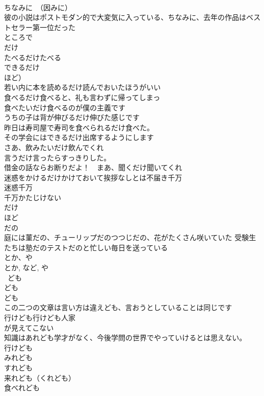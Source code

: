 \documentclass[8pt]{extreport}
\begin{document}
\begin{CJK}{UTF8}{min}
\\	ちなみに　（因みに）	
\\	彼の小説はポストモダン的で大変気に入っている、ちなみに、去年の作品はベストセラー第一位だった	
\\	ところで 
\\	だけ　
\\	たべるだけたべる 
\\	できるだけ	
\\	ほど） 
\\	若い内に本を読めるだけ読んでおいたほうがいい 
\\	食べるだけ食べると、礼も言わずに帰ってしまっ 
\\	食べたいだけ食べるのが僕の主義です 
\\	うちの子は背が伸びるだけ伸びた感じです 
\\	昨日は寿司屋で寿司を食べられるだけ食べた。 
\\	その学会にはできるだけ出席するようにします 
\\	さあ、飲みたいだけ飲んでくれ　 
\\	言うだけ言ったらすっきりした。 
\\	借金の話ならお断りだよ！　まあ、聞くだけ聞いてくれ 
\\	迷惑をかけるだけかけておいて挨拶なしとは不届き千万
\\	迷惑千万 
\\	千万かたじけない 
\\	だけ
\\	ほど
\\	だの 
\\	庭には菫だの、チューリップだのつつじだの、花がたくさん咲いていた 受験生たちは塾だのテストだのと忙しい毎日を送っている 
\\	とか、や 
\\	とか, など, や
\\	~ども 
\\	ども
\\	ども 
\\	この二つの文章は言い方は違えども、言おうとしていることは同じです 
\\	行けども行けども人家
\\	が見えてこない 
\\	知識はあれども学才がなく、今後学問の世界でやっていけるとは思えない。
\\	行けども 
\\	みれども 
\\	すれども 
\\	来れども（くれども） 
\\	食べれども 

\end{CJK}
\end{document}

